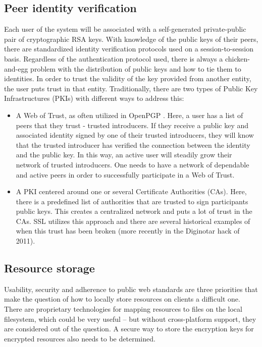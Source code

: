 \subsection{Peer identity verification}
Each user of the system will be associated with a self-generated private-public pair of cryptographic RSA keys. With knowledge of the public keys of their peers, there are standardized identity verification protocols used on a session-to-session basis. Regardless of the authentication protocol used, there is always a chicken-and-egg problem with the distribution of public keys and how to tie them to identities. In order to trust the validity of the key provided from another entity, the user puts trust in that entity. Traditionally, there are two types of Public Key Infrastructures (PKIs) with different ways to address this:

\begin{itemize}
  \item A Web of Trust, as often utilized in OpenPGP \cite{Maurer:1996}. Here, a user has a list of peers that they trust - trusted introducers. If they receive a public key and associated identity signed by one of their trusted introducers, they will know that the trusted introducer has verified the connection between the identity and the public key. In this way, an active user will steadily grow their network of trusted introducers. One needs to have a network of dependable and active peers in order to successfully participate in a Web of Trust.
\item A PKI centered around one or several Certificate Authorities (CAs). Here, there is a predefined list of authorities that are trusted to sign participants public keys. This creates a centralized network and puts a lot of trust in the CAs. SSL utilizes this approach and there are several historical examples of when this trust has been broken (more recently in the Diginotar hack of 2011).
\end{itemize}

\subsection{Resource storage}
Usability, security and adherence to public web standards are three priorities that make the question of how to locally store resources on clients a difficult one. There are proprietary technologies for mapping resources to files on the local filesystem, which could be very useful – but without cross-platform support, they are considered out of the question. A secure way to store the encryption keys for encrypted resources also needs to be determined.

